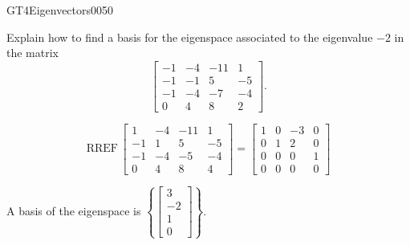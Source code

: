 \begin{exercise}{GT4}{Eigenvectors}{0050} 
\begin{exerciseStatement} 

Explain how to find a basis for the eigenspace associated to the eigenvalue \(-2\) in the matrix \[\left[\begin{array}{cccc}
-1 & -4 & -11 & 1 \\
-1 & -1 & 5 & -5 \\
-1 & -4 & -7 & -4 \\
0 & 4 & 8 & 2
\end{array}\right].\]

 \end{exerciseStatement}
 \begin{exerciseAnswer} 

\[\mathrm{RREF}\,\left[\begin{array}{cccc}
1 & -4 & -11 & 1 \\
-1 & 1 & 5 & -5 \\
-1 & -4 & -5 & -4 \\
0 & 4 & 8 & 4
\end{array}\right]=\left[\begin{array}{cccc}
1 & 0 & -3 & 0 \\
0 & 1 & 2 & 0 \\
0 & 0 & 0 & 1 \\
0 & 0 & 0 & 0
\end{array}\right]\]

 

A basis of the eigenspace is \(\left\{ \left[\begin{array}{c}
3 \\
-2 \\
1 \\
0
\end{array}\right] \right\}\).

 \end{exerciseAnswer}
 \end{exercise}



